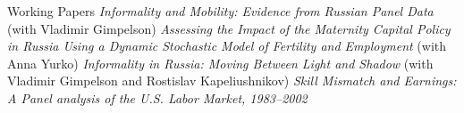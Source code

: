 
\def\arraystretch{1.3}
\begin{rubric}{Working Papers}
\entry*[2013] \emph{Informality and Mobility: Evidence from Russian Panel Data} (with Vladimir Gimpelson)
\entry*[2012] \emph{Assessing the Impact of the Maternity Capital Policy in Russia Using a Dynamic Stochastic Model of Fertility and Employment} (with Anna Yurko)
\entry*[2012] \emph{Informality in Russia: Moving Between Light and Shadow} (with Vladimir Gimpelson and Rostislav Kapeliushnikov)
\entry*[2008] \emph{Skill Mismatch and Earnings: A Panel analysis of the U.S. Labor Market, 1983--2002}
\end{rubric}
